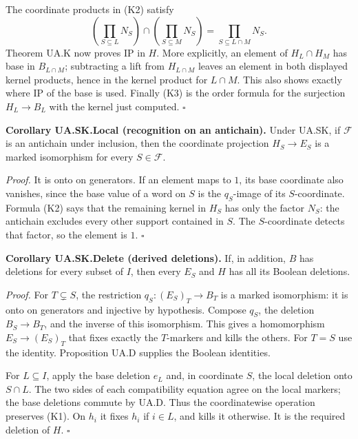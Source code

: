 The coordinate products in (K2) satisfy
\[
\left(\prod_{S\subseteq L}N_S\right)\cap
\left(\prod_{S\subseteq M}N_S\right)
=\prod_{S\subseteq L\cap M}N_S.
\]
Theorem UA.K now proves IP in \(H\). More explicitly, an element of \(H_L\cap H_M\) has base in \(B_{L\cap M}\); subtracting a lift from \(H_{L\cap M}\) leaves an element in both displayed kernel products, hence in the kernel product for \(L\cap M\). This also shows exactly where IP of the base is used. Finally (K3) is the order formula for the surjection \(H_L\to B_L\) with the kernel just computed. \(\square\)

\textbf{Corollary UA.SK.Local (recognition on an antichain).} Under UA.SK, if \(\mathcal F\) is an antichain under inclusion, then the coordinate projection \(H_S\to E_S\) is a marked isomorphism for every \(S\in\mathcal F\).

\emph{Proof.} It is onto on generators. If an element maps to \(1\), its base coordinate also vanishes, since the base value of a word on \(S\) is the \(q_S\)-image of its \(S\)-coordinate. Formula (K2) says that the remaining kernel in \(H_S\) has only the factor \(N_S\): the antichain excludes every other support contained in \(S\). The \(S\)-coordinate detects that factor, so the element is \(1\). \(\square\)

\textbf{Corollary UA.SK.Delete (derived deletions).} If, in addition, \(B\) has deletions for every subset of \(I\), then every \(E_S\) and \(H\) has all its Boolean deletions.

\emph{Proof.} For \(T\subsetneq S\), the restriction \(q_S:(E_S)_T\to B_T\) is a marked isomorphism: it is onto on generators and injective by hypothesis. Compose \(q_S\), the deletion \(B_S\to B_T\), and the inverse of this isomorphism. This gives a homomorphism \(E_S\to(E_S)_T\) that fixes exactly the \(T\)-markers and kills the others. For \(T=S\) use the identity. Proposition UA.D supplies the Boolean identities.

For \(L\subseteq I\), apply the base deletion \(e_L\) and, in coordinate \(S\), the local deletion onto \(S\cap L\). The two sides of each compatibility equation agree on the local markers; the base deletions commute by UA.D. Thus the coordinatewise operation preserves (K1). On \(h_i\) it fixes \(h_i\) if \(i\in L\), and kills it otherwise. It is the required deletion of \(H\). \(\square\)
